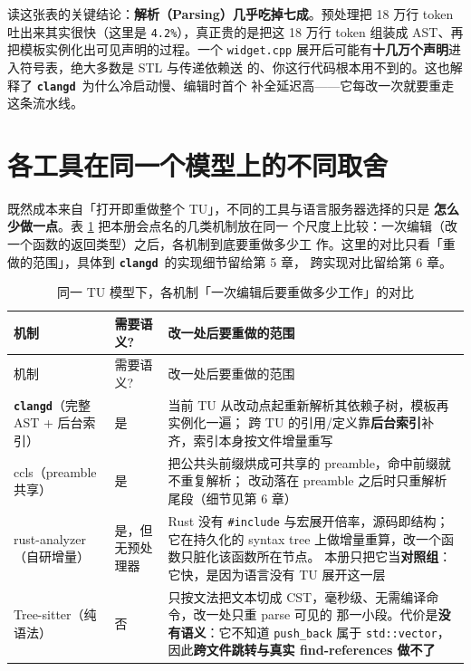 \documentclass[12pt,a4paper,fontset=fandol]{ctexbook}
\newcommand{\Lib}[1]{\textbf{\texttt{#1}}}
\newcommand{\Lang}[1]{\textsf{#1}}
\newcommand{\CD}{\Lib{clangd}}
\begin{document}
读这张表的关键结论：\textbf{解析（Parsing）几乎吃掉七成}。预处理把 18 万行
token 吐出来其实很快（这里是 \texttt{4.2\%}），真正贵的是把这 18 万行
token 组装成 AST、再把模板实例化出可见声明的过程。一个 \texttt{widget.cpp}
展开后可能有\textbf{十几万个声明}进入符号表，绝大多数是 STL 与传递依赖送
的、你这行代码根本用不到的。这也解释了 \CD\ 为什么冷启动慢、编辑时首个
补全延迟高——它每改一次就要重走这条流水线。

\section{各工具在同一个模型上的不同取舍}
\label{sec:ch03-s2}

既然成本来自「打开即重做整个 TU」，不同的工具与语言服务器选择的只是
\textbf{怎么少做一点}。表 \ref{tab:ch03-cost} 把本册会点名的几类机制放在同一
个尺度上比较：一次编辑（改一个函数的返回类型）之后，各机制到底要重做多少工
作。这里的对比只看「重做的范围」，具体到 \CD\ 的实现细节留给第 5 章，
跨实现对比留给第 6 章。

\begin{longtable}{>{\raggedright\arraybackslash}p{}
                  >{\raggedright\arraybackslash}p{}
                  >{\raggedright\arraybackslash}p{}}
\caption{同一 TU 模型下，各机制「一次编辑后要重做多少工作」的对比}\label{tab:ch03-cost}\\
\toprule
机制 & 需要语义? & 改一处后要重做的范围 \\
\midrule
\endfirsthead
\toprule
机制 & 需要语义? & 改一处后要重做的范围 \\
\midrule
\endhead
\CD（完整 AST + 后台索引） & 是 &
  当前 TU 从改动点起重新解析其依赖子树，模板再实例化一遍；
  跨 TU 的引用/定义靠\textbf{后台索引}补齐，索引本身按文件增量重写 \\
\midrule
ccls（preamble 共享） & 是 &
  把公共头前缀烘成可共享的 preamble，命中前缀就不重复解析；
  改动落在 preamble 之后时只重解析尾段（细节见第 6 章） \\
\midrule
rust-analyzer（自研增量） & 是，但无预处理器 &
  \Lang{Rust} 没有 \texttt{\#include} 与宏展开倍率，源码即结构；
  它在持久化的 syntax tree 上做增量重算，改一个函数只脏化该函数所在节点。
  本册只把它当\textbf{对照组}：它快，是因为语言没有 TU 展开这一层 \\
\midrule
Tree-sitter（纯语法） & 否 &
  只按文法把文本切成 CST，毫秒级、无需编译命令，改一处只重 parse 可见的
  那一小段。代价是\textbf{没有语义}：它不知道 \texttt{push\_back} 属于
  \texttt{std::vector}，因此\textbf{跨文件跳转与真实 find-references 做不了} \\
\bottomrule
\end{longtable}
\end{document}
